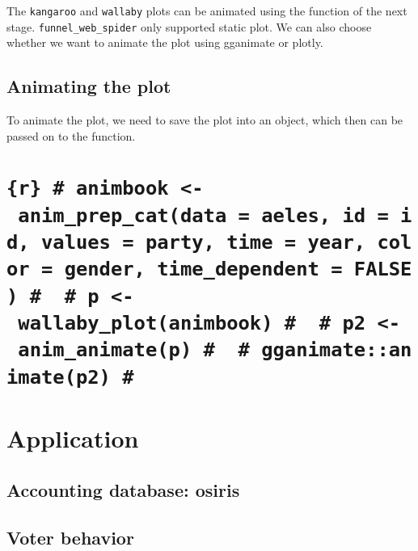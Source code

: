 The \texttt{kangaroo} and \texttt{wallaby} plots can be animated using the function of the next stage. \texttt{funnel\_web\_spider} only supported static plot. We can also choose whether we want to animate the plot using gganimate or plotly.

\hypertarget{animating-the-plot}{%
\subsection{Animating the plot}\label{animating-the-plot}}

To animate the plot, we need to save the plot into an object, which then can be passed on to the function.

\hypertarget{r-animbook---anim_prep_catdata-aeles-id-id-values-party-time-year-color-gender-time_dependent-false-p---wallaby_plotanimbook-p2---anim_animatep-gganimateanimatep2}{%
\section{\texorpdfstring{\texttt{\{r\}\ \#\ animbook\ \textless{}-\ anim\_prep\_cat(data\ =\ aeles,\ id\ =\ id,\ values\ =\ party,\ time\ =\ year,\ color\ =\ gender,\ time\_dependent\ =\ FALSE)\ \#\ \ \#\ p\ \textless{}-\ wallaby\_plot(animbook)\ \#\ \ \#\ p2\ \textless{}-\ anim\_animate(p)\ \#\ \ \#\ gganimate::animate(p2)\ \#}}{\{r\} \# animbook \textless- anim\_prep\_cat(data = aeles, id = id, values = party, time = year, color = gender, time\_dependent = FALSE) \#  \# p \textless- wallaby\_plot(animbook) \#  \# p2 \textless- anim\_animate(p) \#  \# gganimate::animate(p2) \#}}\label{r-animbook---anim_prep_catdata-aeles-id-id-values-party-time-year-color-gender-time_dependent-false-p---wallaby_plotanimbook-p2---anim_animatep-gganimateanimatep2}}

\hypertarget{application}{%
\section{Application}\label{application}}

\hypertarget{accounting-database-osiris}{%
\subsection{Accounting database: osiris}\label{accounting-database-osiris}}

\hypertarget{voter-behavior}{%
\subsection{Voter behavior}\label{voter-behavior}}

